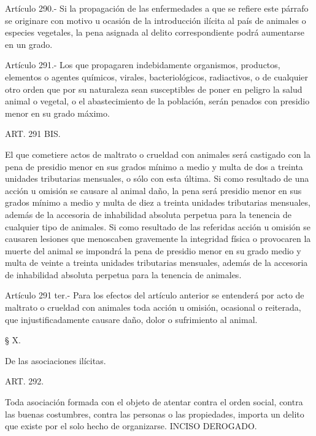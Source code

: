     Artículo 290.- Si la propagación de las enfermedades a que se refiere este párrafo se originare con motivo u ocasión de la introducción ilícita al país de animales o especies vegetales, la pena asignada al delito correspondiente podrá aumentarse en un grado.





    Artículo 291.- Los que propagaren indebidamente organismos, productos, elementos o agentes químicos, virales, bacteriológicos, radiactivos, o de cualquier otro orden que por su naturaleza sean susceptibles de poner en peligro la salud animal o vegetal, o el abastecimiento de la población, serán penados con presidio menor en su grado máximo.


    ART. 291 BIS.

    El que cometiere actos de maltrato o crueldad con animales será castigado con la pena de presidio menor en sus grados mínimo a medio y multa de dos a treinta unidades tributarias mensuales, o sólo con esta última.
    Si como resultado de una acción u omisión se causare al animal daño, la pena será presidio menor en sus grados mínimo a medio y multa de diez a treinta unidades tributarias mensuales, además de la accesoria de inhabilidad absoluta perpetua para la tenencia de cualquier tipo de animales.
    Si como resultado de las referidas acción u omisión se causaren lesiones que menoscaben gravemente la integridad física o provocaren la muerte del animal se impondrá la pena de presidio menor en su grado medio y multa de veinte a treinta unidades tributarias mensuales, además de la accesoria de inhabilidad absoluta perpetua para la tenencia de animales.



    Artículo 291 ter.- Para los efectos del artículo anterior se entenderá por acto de maltrato o crueldad con animales toda acción u omisión, ocasional o reiterada, que injustificadamente causare daño, dolor o sufrimiento al animal.



    § X.

    De las asociaciones ilícitas.





    ART. 292.

    Toda asociación formada con el objeto de atentar contra el orden social, contra las buenas costumbres, contra las personas o las propiedades, importa un delito que existe por el solo hecho de organizarse.
    INCISO DEROGADO.




